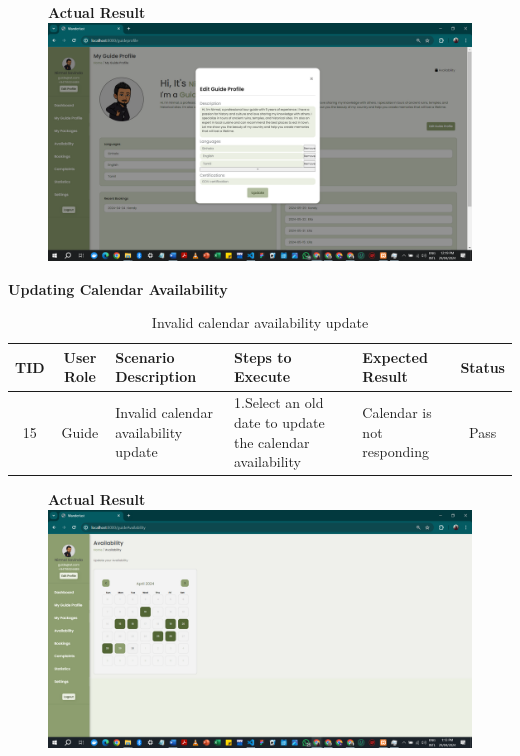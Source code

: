 \begin{figure}[h!]
    \centering
    \textbf{Actual Result}
    \includegraphics[width=1\textwidth]{Images/Test Cases/14. profile edit.png}
\end{figure}
\clearpage


\textbf{Updating Calendar Availability}\\
\begin{table}[ht]
\centering
\begin{tabularx}{\textwidth}{|c|c|X|X|X|c|}
\hline
\textbf{TID} & \textbf{User Role} & \textbf{Scenario Description} & \textbf{Steps to Execute} & \textbf{Expected Result} & \textbf{Status} \\ \hline
15 & Guide & Invalid calendar availability update & 1.Select an old date to update the calendar availability & Calendar is not responding & Pass \\ \hline
\end{tabularx}
\caption{Invalid calendar availability update}
\end{table}

\begin{figure}[h!]
    \centering
    \textbf{Actual Result}
    \includegraphics[width=1\textwidth]{Images/Test Cases/15. invalid Calendar availability.png}
\end{figure}
\clearpage



